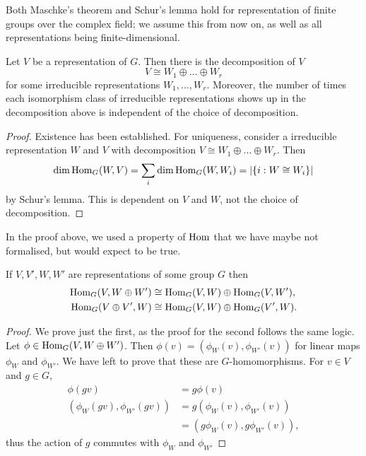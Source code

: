 Both Maschke's theorem and Schur's lemma hold for representation of finite groups over the complex field; we assume this from now on, as well as all representations being finite-dimensional.

\begin{corollary}
  Let $V$ be a representation of $G$. Then there is the decomposition of $V$
  \[  V \cong W_1 \oplus \ldots \oplus W_r \]
  for some irreducible representations $W_1, \ldots, W_r$. Moreover, the number of times each isomorphism class of irreducible representations shows up in the decomposition above is independent of the choice of decomposition.
\end{corollary}

\begin{proof}
  Existence has been established. For uniqueness, consider a irreducible representation $W$ and $V$ with decomposition $V \cong W_1 \oplus \ldots \oplus W_r$. Then
  \[\dim\operatorname{Hom}_G(W,V) = \sum_i\dim\operatorname{Hom}_G(W,W_i) = \lvert\{i: W \cong W_i\}\rvert\]
  by Schur's lemma. This is dependent on $V$ and $W$, not the choice of decomposition.
\end{proof}

In the proof above, we used a property of $\operatorname{Hom}$ that we have maybe not formalised, but would expect to be true.

\begin{lemma}
  If $V, V', W, W'$ are representations of some group $G$ then
  \begin{align*}
    \operatorname{Hom}_G(V, W \oplus W') & \cong \operatorname{Hom}_G(V, W) \oplus \operatorname{Hom}_G(V, W'), \\
    \operatorname{Hom}_G(V \oplus V', W) & \cong \operatorname{Hom}_G(V, W) \oplus \operatorname{Hom}_G(V', W).
  \end{align*}
\end{lemma}

\begin{proof}
  We prove just the first, as the proof for the second follows the same logic. Let $\phi \in \operatorname{Hom}_G(V, W \oplus W')$. Then $\phi(v) = (\phi_W(v), \phi_{W'}(v))$ for linear maps $\phi_W$ and $\phi_{W'}$. We have left to prove that these are $G$-homomorphisms. For $v \in V$ and $g \in G$,
  \begin{align*}
    \phi(gv)                    & = g\phi(v)                     \\
    (\phi_W(gv), \phi_{W'}(gv)) & = g(\phi_W(v), \phi_{W'}(v))   \\
                                & = (g\phi_W(v), g\phi_{W'}(v)),
  \end{align*}
  thus the action of $g$ commutes with $\phi_W$ and $\phi_{W'}$
\end{proof}


